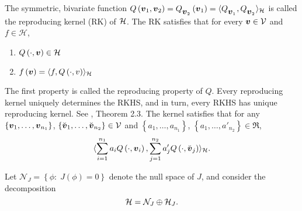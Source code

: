 The symmetric, bivariate function $Q\left(\mbox{\boldmath $v$}_1, \mbox{\boldmath $v$}_2 \right) = Q_{_{\mbox{\boldmath $v$}_2 }}\left(\mbox{\boldmath $v$}_1\right) = \langle Q_{_{\mbox{\boldmath $v$}_1}}, Q_{_{\mbox{\boldmath $v$}_2}} \rangle_{\mathcal{H}}$ is called the reproducing kernel (RK) of $\mathcal{H}$. The RK satisfies that for every $\mbox{\boldmath $v$} \in \mathcal{V}$ and $f \in \mathcal{H}$,

\begin{enumerate}
\item $Q\left(\cdot, \mbox{\boldmath $v$} \right) \in \mathcal{H}$ 
\item $f\left(\mbox{\boldmath $v$}\right) = \langle f, Q\left(\cdot, v\right)\rangle_{\mathcal{H}}$\label{rkhs-reproducing-property}
\end{enumerate}
\noindent
The first property is called the reproducing property of $Q$. Every reproducing kernel uniquely determines the RKHS, and in turn, every RKHS has unique reproducing kernel. See \cite{gu2013smoothing}, Theorem 2.3. The kernel satisfies that for any $\left\{\mbox{\boldmath $v$}_1,\dots, \mbox{\boldmath $v$}_{n_1}\right\}$, $\left\{\breve{\mbox{\boldmath $v$}}_1,\dots, \breve{\mbox{\boldmath $v$}}_{n_2}\right\} \in \mathcal{V}$ and $\left\{a_1,\dots, a_{n_1}\right\}$, $\left\{a_1,\dots, a'_{n_2}\right\} \in \Re$,
\begin{equation}
 \langle\sum_{i = 1}^{n_1} a_i Q\left(\cdot, \mbox{\boldmath $v$}_i\right), \sum_{j = 1}^{n_2} a'_j Q\left(\cdot, \breve{\mbox{\boldmath $v$}}_j\right) \rangle_{\mathcal{H}}.
\end{equation}

\bigskip

Let $\mathcal{N}_J = \left\{ \phi:\; J\left(\phi\right) = 0\right\}$ denote the null space of $J$, and consider the decomposition
\[
\mathcal{H} = \mathcal{N}_J \oplus \mathcal{H}_J.
\]

